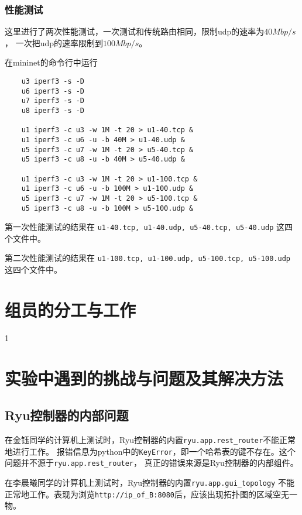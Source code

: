 \subsubsection{性能测试}

这里进行了两次性能测试，一次测试和传统路由相同，限制udp的速率为$40 Mbp/s$，
一次把udp的速率限制到$100 Mbp/s$。

在mininet的命令行中运行

\begin{lstlisting}
	u3 iperf3 -s -D
	u6 iperf3 -s -D
	u7 iperf3 -s -D
	u8 iperf3 -s -D

	u1 iperf3 -c u3 -w 1M -t 20 > u1-40.tcp &
	u1 iperf3 -c u6 -u -b 40M > u1-40.udp &
	u5 iperf3 -c u7 -w 1M -t 20 > u5-40.tcp &
	u5 iperf3 -c u8 -u -b 40M > u5-40.udp &

	u1 iperf3 -c u3 -w 1M -t 20 > u1-100.tcp &
	u1 iperf3 -c u6 -u -b 100M > u1-100.udp &
	u5 iperf3 -c u7 -w 1M -t 20 > u5-100.tcp &
	u5 iperf3 -c u8 -u -b 100M > u5-100.udp &
\end{lstlisting}

第一次性能测试的结果在 \texttt{u1-40.tcp, u1-40.udp, u5-40.tcp, u5-40.udp} 这四个文件中。

第二次性能测试的结果在 \texttt{u1-100.tcp, u1-100.udp, u5-100.tcp, u5-100.udp} 这四个文件中。

\section{组员的分工与工作}

1\cite{long2015fully}

\section{实验中遇到的挑战与问题及其解决方法}

\subsection{Ryu控制器的内部问题}

在金钰同学的计算机上测试时，Ryu控制器的内置\texttt{ryu.app.rest\_router}不能正常地进行工作。
报错信息为python中的\texttt{KeyError}，即一个哈希表的键不存在。这个问题并不源于\texttt{ryu.app.rest\_router}，
真正的错误来源是Ryu控制器的内部组件。

在李晨曦同学的计算机上测试时，Ryu控制器的内置\texttt{ryu.app.gui\_topology}
不能正常地工作。表现为浏览\texttt{http://ip\_of\_B:8080}后，应该出现拓扑图的区域空无一物。

